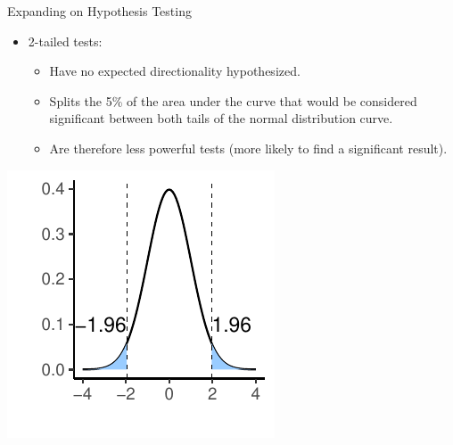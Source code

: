 \documentclass[
  ignorenonframetext,
]{beamer}
\providecommand{\tightlist}{%
  \setlength{\itemsep}{0pt}\setlength{\parskip}{0pt}}
\begin{document}
\begin{frame}{Expanding on Hypothesis Testing}
\label{expanding-on-hypothesis-testing-2}
\begin{itemize}
\tightlist
\item
  2-tailed tests:

  \begin{itemize}
  \tightlist
  \item
    Have no expected directionality hypothesized.
  \item
    Splits the 5\% of the area under the curve that would be considered
    significant between both tails of the normal distribution curve.
  \item
    Are therefore less powerful tests (more likely to find a significant
    result).
  \end{itemize}
\end{itemize}

\includegraphics{Inferential-Stat-and-Z-test_files/figure-beamer/unnamed-chunk-5-1.pdf}
\end{frame}
\end{document}
